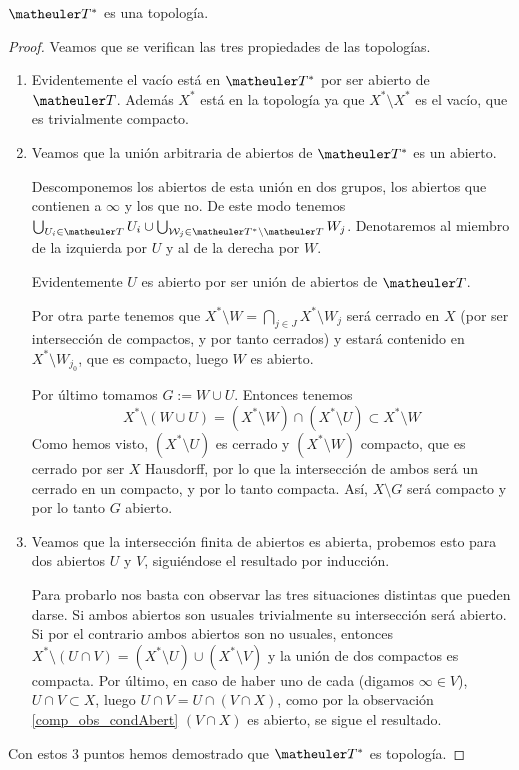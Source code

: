 \begin{lem}
	$\T^*$ es una topología.
\end{lem}
\begin{proof} Veamos que se verifican las tres propiedades de las topologías.
	\begin{enumerate}
		\item Evidentemente el vacío está en $\T^*$ por ser abierto de $\T$. Además $X^*$ está en la topología ya que $X^*\setminus X^*$ es el vacío, que es trivialmente compacto. 
		\item Veamos que la unión arbitraria de abiertos de $\T^*$ es un abierto.
		
		Descomponemos los abiertos de esta unión en dos grupos, los abiertos que contienen a $\infty$ y los que no. De este modo tenemos  
		$\bigcup_{U_i\in\T}U_i \cup \bigcup_{\W_j\in\T^*\setminus \T}W_j$. 
		Denotaremos al miembro de la izquierda por $U$ y al de la derecha por $W$.
		
		Evidentemente $U$ es abierto por ser unión de abiertos de $\T$.
		
		Por otra parte tenemos que $X^*\setminus W=\bigcap_{j\in J} X^*\setminus W_j$ será cerrado en $X$ (por ser intersección de compactos, y por tanto cerrados) y estará contenido en $X^*\setminus W_{j_0}$, que es compacto, luego $W$ es abierto.
		
		Por último tomamos $G:=W\cup U$. Entonces tenemos \[X^*\setminus (W\cup U)= (X^*\setminus W)\cap(X^*\setminus U)\subset X^*\setminus W\]
		Como hemos visto, $(X^*\setminus U)$ es cerrado y $(X^*\setminus W)$ compacto, que es cerrado por ser $X$ Hausdorff, por lo que la intersección de ambos será un cerrado en un compacto, y por lo tanto compacta. Así, $X\setminus G$ será compacto y por lo tanto $G$ abierto.
		
		\item Veamos que la intersección finita de abiertos es abierta, probemos esto para dos abiertos $U$ y $V$, siguiéndose el resultado por inducción.
		
		Para probarlo nos basta con observar las tres situaciones distintas que pueden darse. Si ambos abiertos son usuales trivialmente su intersección será abierto. Si por el contrario ambos abiertos son no usuales, entonces $X^*\setminus(U\cap V)=(X^*\setminus U)\cup(X^*\setminus V)$ y la unión de dos compactos es compacta. Por último, en caso de haber uno de cada (digamos $\infty\in V$), $U\cap V\subset X$, luego $U\cap V=U\cap (V\cap X)$, como por la observación \ref{comp_obs_condAbert} $(V\cap X)$ es abierto, se sigue el resultado.
	\end{enumerate}
	Con estos 3 puntos hemos demostrado que $\T^*$ es topología.	
\end{proof}

